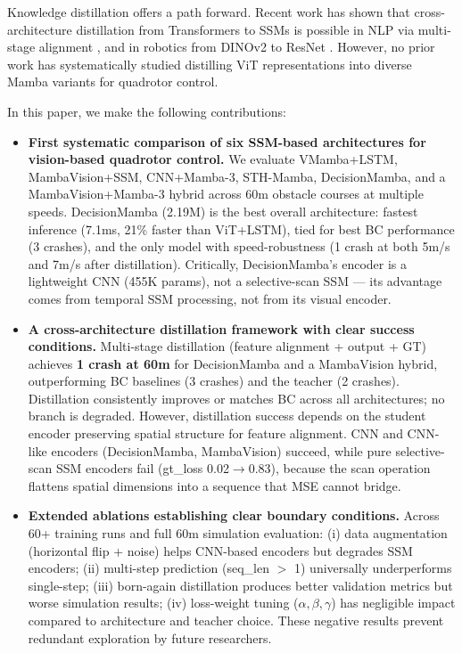 \documentclass{article}
\begin{document}
Knowledge distillation \cite{hinton2015distilling} offers a path forward. Recent work has shown that cross-architecture distillation from Transformers to SSMs is possible in NLP via multi-stage alignment \cite{bick2024mohawk}, and in robotics from DINOv2 to ResNet \cite{shao2025xdistill}. However, no prior work has systematically studied distilling ViT representations into diverse Mamba variants for quadrotor control.

In this paper, we make the following contributions:

\begin{itemize}
    \item \textbf{First systematic comparison of six SSM-based architectures for vision-based quadrotor control.} We evaluate VMamba+LSTM, MambaVision+SSM, CNN+Mamba-3, STH-Mamba, DecisionMamba, and a MambaVision+Mamba-3 hybrid across 60m obstacle courses at multiple speeds. DecisionMamba (2.19M) is the best overall architecture: fastest inference (7.1ms, 21\% faster than ViT+LSTM), tied for best BC performance (3 crashes), and the only model with speed-robustness (1 crash at both 5m/s and 7m/s after distillation). Critically, DecisionMamba's encoder is a lightweight CNN (455K params), not a selective-scan SSM --- its advantage comes from temporal SSM processing, not from its visual encoder.

    \item \textbf{A cross-architecture distillation framework with clear success conditions.} Multi-stage distillation (feature alignment + output + GT) achieves \textbf{1 crash at 60m} for DecisionMamba and a MambaVision hybrid, outperforming BC baselines (3 crashes) and the teacher (2 crashes). Distillation consistently improves or matches BC across all architectures; no branch is degraded. However, distillation success depends on the student encoder preserving spatial structure for feature alignment. CNN and CNN-like encoders (DecisionMamba, MambaVision) succeed, while pure selective-scan SSM encoders fail (gt\_loss 0.02$\rightarrow$0.83), because the scan operation flattens spatial dimensions into a sequence that MSE cannot bridge.

    \item \textbf{Extended ablations establishing clear boundary conditions.} Across 60+ training runs and full 60m simulation evaluation: (i) data augmentation (horizontal flip + noise) helps CNN-based encoders but degrades SSM encoders; (ii) multi-step prediction (seq\_len $>$ 1) universally underperforms single-step; (iii) born-again distillation produces better validation metrics but worse simulation results; (iv) loss-weight tuning ($\alpha,\beta,\gamma$) has negligible impact compared to architecture and teacher choice. These negative results prevent redundant exploration by future researchers.
\end{itemize}
\end{document}
